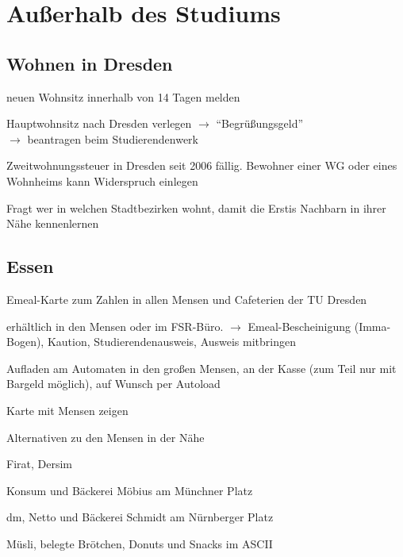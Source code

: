 \documentclass[a4paper,12pt]{scrreprt}
\begin{document}
\pagebreak

\section{Außerhalb des Studiums}

\subsection{Wohnen in Dresden}
\begin{itemize*}
    \item neuen Wohnsitz innerhalb von 14 Tagen melden
    \item Hauptwohnsitz nach Dresden verlegen $\rightarrow$  \enquote{Begrüßungsgeld}\\
    $\rightarrow$ beantragen beim Studierendenwerk
    \item Zweitwohnungssteuer in Dresden seit 2006 fällig. Bewohner einer WG oder eines Wohnheims kann Widerspruch einlegen
    \item Fragt wer in welchen Stadtbezirken wohnt, damit die Erstis Nachbarn in ihrer Nähe kennenlernen
\end{itemize*}

\subsection{Essen}
\begin{itemize*}
    \item Emeal-Karte zum Zahlen in allen Mensen und Cafeterien der TU Dresden
    \item erhältlich in den Mensen oder im FSR-Büro.
    $\rightarrow$ Emeal-Bescheinigung (Imma-Bogen),  Kaution, Studierendenausweis, Ausweis mitbringen
    \item Aufladen am Automaten in den großen Mensen, an der Kasse (zum Teil nur mit Bargeld möglich), auf Wunsch per Autoload
    \item Karte mit Mensen zeigen
    \item Alternativen zu den Mensen in der Nähe
    \begin{itemize*}
        \item Firat, Dersim
        \item Konsum und Bäckerei Möbius am Münchner Platz
        \item dm, Netto und Bäckerei Schmidt am Nürnberger Platz
        \item Müsli, belegte Brötchen, Donuts und Snacks im ASCII
    \end{itemize*}
\end{itemize*}
\end{document}
